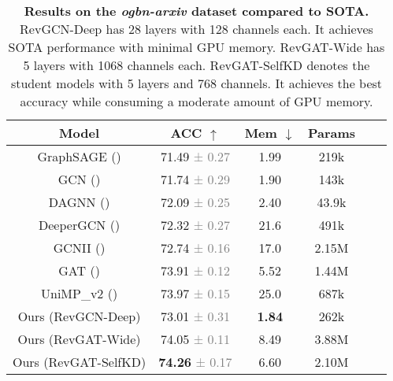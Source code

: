 \documentclass{article}
\begin{document}
\begin{table}[!htb]
\vspace{-8pt}
\centering
\setlength{\tabcolsep}{1pt}
\caption{\textbf{Results on the \emph{ogbn-arxiv} dataset compared to SOTA.} RevGCN-Deep has 28 layers with 128 channels each. It achieves SOTA performance with minimal GPU memory. RevGAT-Wide has 5 layers with 1068 channels each. RevGAT-SelfKD denotes the student models with 5 layers and 768 channels. It achieves the best accuracy while consuming a moderate amount of GPU memory.}
\vspace{2pt}
\begin{tabular}{cccccc}
\toprule
  \label{table:ogbn_arxiv_sota}
  \centering
Model & ACC $\uparrow$
& Mem $\downarrow$
& Params \\
\midrule
GraphSAGE (\citeauthor{hamilton2017inductive}) & 71.49 \textcolor{gray}{\small{± 0.27}}
& 1.99
& 219k \\
GCN (\citeauthor{kipf2017semi}) & 71.74 \textcolor{gray}{\small{± 0.29}}
& 1.90 
& 143k \\
DAGNN (\citeauthor{liu2020towards}) & 72.09 \textcolor{gray}{\small{± 0.25}}
& 2.40 
& 43.9k \\
DeeperGCN (\citeauthor{li2020deepergcn}) & 72.32 \textcolor{gray}{\small{± 0.27}}
& 21.6 
& 491k \\
GCNII (\citeauthor{chen2020simple}) & 72.74 \textcolor{gray}{\small{± 0.16}}
& 17.0
& 2.15M \\
GAT (\citeauthor{veli2018gat}) & 73.91 \textcolor{gray}{\small{± 0.12}}
& 5.52
& 1.44M \\
UniMP\_v2 (\citeauthor{shi2020masked}) & 73.97 \textcolor{gray}{\small{± 0.15}}
& 25.0
& 687k \\
\midrule
Ours (RevGCN-Deep) & 73.01 \textcolor{gray}{\small{± 0.31}}
& \textbf{1.84}
& 262k \\
Ours (RevGAT-Wide) & 74.05 \textcolor{gray}{\small{± 0.11}} & 8.49  & 3.88M \\
Ours (RevGAT-SelfKD) & \textbf{74.26} \textcolor{gray}{\small{± 0.17}} & 6.60  & 2.10M
\\
\bottomrule
\end{tabular}
\end{table}
\end{document}
